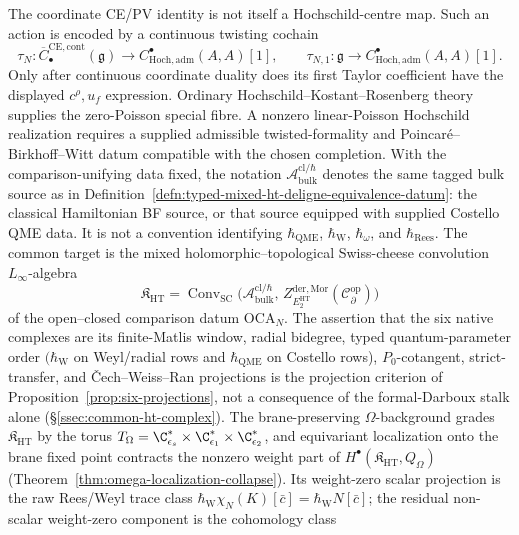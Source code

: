 The coordinate CE/PV identity is not itself a Hochschild-centre map.
Such an action is encoded by a continuous twisting cochain
\[
  \tau_N\colon
  \overline C^{\mathrm{CE},\mathrm{cont}}_\bullet(\mathfrak g)
  \longrightarrow
  C^\bullet_{\mathrm{Hoch},\mathrm{adm}}(A,A)[1],
  \qquad
  \tau_{N,1}\colon\mathfrak g\longrightarrow
  C^\bullet_{\mathrm{Hoch},\mathrm{adm}}(A,A)[1].
\]
Only after continuous coordinate duality does its first Taylor
coefficient have the displayed \(c^\rho,u_f\) expression.  Ordinary
Hochschild--Kostant--Rosenberg theory supplies the zero-Poisson special
fibre.  A nonzero linear-Poisson Hochschild realization requires a
supplied admissible twisted-formality and Poincar\'e--Birkhoff--Witt
datum compatible with the chosen completion.
With the comparison-unifying data fixed, the notation
\(\mathcal A^{\mathrm{cl}/\hbar}_{\mathrm{bulk}}\) denotes the same
tagged bulk source as in
Definition~\ref{defn:typed-mixed-ht-deligne-equivalence-datum}: the
classical Hamiltonian BF source, or that source equipped with supplied
Costello QME data.  It is not a convention identifying
\(\hbar_{\mathrm{QME}}\), \(\hbar_{\mathrm{W}}\), \(\hbar_\omega\), and
\(\hbar_{\mathrm{Rees}}\).  The common target is the mixed
holomorphic--topological Swiss-cheese convolution \(L_\infty\)-algebra
\[
  \mathfrak K_{\mathrm{HT}}
  =\operatorname{Conv}_{\mathrm{SC}}\bigl(
   \mathcal A^{\mathrm{cl}/\hbar}_{\mathrm{bulk}},\,
   Z^{\mathrm{der},\mathrm{Mor}}_{E_2^{\mathrm{HT}}}
     (\mathcal C^{\mathrm{op}}_\partial)\bigr)
\]
of the open--closed comparison datum
\(\mathrm{OCA}_N\).  The assertion that the six native complexes are
its finite-Matlis window, radial bidegree, typed quantum-parameter order
\((\hbar_{\mathrm{W}}\) on Weyl/radial rows and
\(\hbar_{\mathrm{QME}}\) on Costello rows),
\(P_0\)-cotangent, strict-transfer, and \v Cech--Weiss--Ran projections
is the projection criterion of
Proposition~\ref{prop:six-projections}, not a consequence of the
formal-Darboux stalk alone
(\S\ref{ssec:common-ht-complex}).  The brane-preserving
\(\Omega\)-background grades \(\mathfrak K_{\mathrm{HT}}\) by the torus
\(T_\Omega=\C^*_{\epsilon_s}\times\C^*_{\epsilon_1}\times\C^*_{\epsilon_2}\),
and equivariant localization onto the brane fixed point contracts the
nonzero weight part of
\(H^\bullet(\mathfrak K_{\mathrm{HT}},Q_\Omega)\)
(Theorem~\ref{thm:omega-localization-collapse}).  Its weight-zero
scalar projection is the raw Rees/Weyl trace class
\(\hbar_{\mathrm{W}}\chi_N(K)[\bar c]
=\hbar_{\mathrm{W}}N[\bar c]\);
the residual non-scalar weight-zero component is the cohomology class
